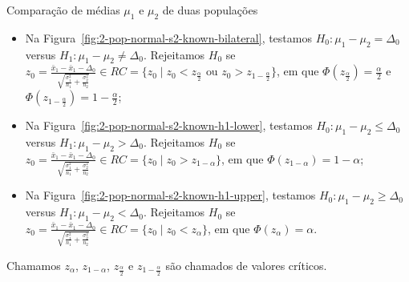 \documentclass[9pt]{beamer}
\begin{document}
\begin{frame}{Comparação de médias $\mu_1$ e $\mu_2$ de duas populações}

\begin{itemize}
	\item Na Figura~\ref{fig:2-pop-normal-s2-known-bilateral}, testamos $H_0: \mu_1 - \mu_2 = \Delta_0$ versus $H_1: \mu_1 - \mu_2 \neq \Delta_0$. Rejeitamos $H_0$ se $z_0 = \frac{\bar{x}_1 - \bar{x}_1 - \Delta_0}{ \sqrt{ \frac{\sigma_1^2}{n_1} + \frac{\sigma_2^2}{n_2} } } \in \allowbreak RC=\{z_0 \mid z_0 < z_\frac{\alpha}{2} \mbox{ ou } z_0 > z_{1-\frac{\alpha}{2}} \}$, em que $\Phi\left( z_\frac{\alpha}{2} \right) = \frac{\alpha}{2}$ e $\Phi\left( z_{1-\frac{\alpha}{2}} \right) = 1- \frac{\alpha}{2}$;
	\vfill
	
	\item Na Figura~\ref{fig:2-pop-normal-s2-known-h1-lower}, testamos $H_0: \mu_1 - \mu_2 \leq \Delta_0 $ versus $H_1: \mu_1 - \mu_2 > \Delta_0$. Rejeitamos $H_0$ se $z_0 = \frac{\bar{x}_1-\bar{x}_1  - \Delta_0}{\sqrt{ \frac{\sigma_1^2}{n_1} + \frac{\sigma_2^2}{n_2} }} \in \allowbreak RC=\{z_0 \mid z_0 > z_{1-\alpha}  \}$, em que $\Phi\left( z_{1-\alpha} \right) =1- \alpha$;
	\vfill
	
	\item Na Figura~\ref{fig:2-pop-normal-s2-known-h1-upper}, testamos $H_0: \mu_1 - \mu_2 \geq \Delta_0$ versus $H_1: \mu_1 - \mu_2  < \Delta_0$. Rejeitamos $H_0$ se $z_0 = \frac{\bar{x}_1-\bar{x}_1  - \Delta_0}{\sqrt{ \frac{\sigma_1^2}{n_1} + \frac{\sigma_2^2}{n_2} }} \in \allowbreak RC=\{z_0 \mid z_0 < z_{\alpha}  \}$, em que $\Phi\left( z_{\alpha} \right) = \alpha$.
\end{itemize}
Chamamos $z_\alpha$, $z_{1-\alpha}$, $z_\frac{\alpha}{2}$ e $z_{1-\frac{\alpha}{2}}$ são chamados de valores críticos.

\end{frame}
\end{document}
